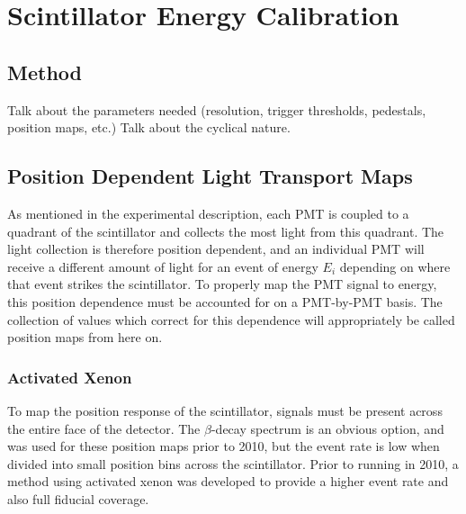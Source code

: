 





\section{Scintillator Energy Calibration}

\subsection{Method}
Talk about the parameters needed (resolution, trigger thresholds, pedestals, position maps, etc.)
Talk about the cyclical nature.

\subsection{Position Dependent Light Transport Maps} \label{ssec:posmaps}

As mentioned in the experimental description, each PMT is coupled to a quadrant of
the scintillator and collects the most light from this quadrant. The light collection
is therefore position dependent, and an individual PMT will receive a different
amount of light for an event of energy $E_i$ depending on where that event strikes
the scintillator. To properly map the PMT signal to energy, this position dependence
must be accounted for on a PMT-by-PMT basis. The collection of values which correct for this
dependence will appropriately be called position maps from here on.


\subsubsection{Activated Xenon}

To map the position response of the scintillator, signals must be present across the
entire face of the detector. The $\beta$-decay spectrum
is an obvious option, and was used for these position maps prior to 2010,
but the event rate is low when divided into small position bins across the scintillator.
Prior to running in 2010, a method using activated xenon was developed to provide
a higher event rate and also full fiducial coverage.


